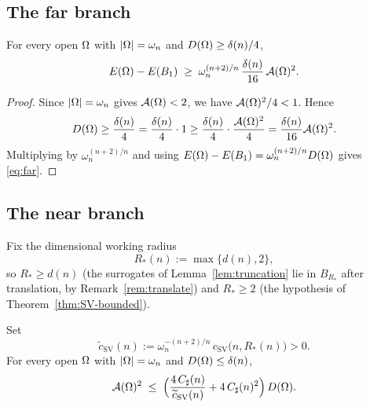 \subsection{The far branch}\label{ssec:far}

\begin{lemma}\label{lem:far}
For every open $\Omega$ with $\left|\Omega\right|=\omega_n$ and
$D(\Omega)\ge\delta(n)/4$,
\begin{equation}\label{eq:far}
   E(\Omega)-E(B_1)\;\ge\;\omega_n^{(n+2)/n}\,\frac{\delta(n)}{16}\,\mathcal{A}(\Omega)^2 .
\end{equation}
\end{lemma}

\begin{proof}
Since $\left|\Omega\right|=\omega_n$ gives $\mathcal{A}(\Omega)<2$, we have
$\mathcal{A}(\Omega)^2/4<1$. Hence
\[
   D(\Omega)\ge\frac{\delta(n)}{4}
   =\frac{\delta(n)}{4}\cdot1
   \ge\frac{\delta(n)}{4}\cdot\frac{\mathcal{A}(\Omega)^2}{4}
   =\frac{\delta(n)}{16}\mathcal{A}(\Omega)^2 .
\]
Multiplying by $\omega_n^{(n+2)/n}$ and using
$E(\Omega)-E(B_1)=\omega_n^{(n+2)/n}D(\Omega)$ gives \eqref{eq:far}.
\end{proof}

\subsection{The near branch}\label{ssec:near}

Fix the dimensional working radius
\begin{equation}\label{eq:Rstar}
   R_*(n):=\max\{d(n),2\},
\end{equation}
so $R_*\ge d(n)$ (the surrogates of Lemma~\ref{lem:truncation} lie in
$B_{R_*}$ after translation, by Remark~\ref{rem:translate}) and
$R_*\ge2$ (the hypothesis of Theorem~\ref{thm:SV-bounded}).

\begin{lemma}\label{lem:near}
Set
\begin{equation}\label{eq:csv-tilde}
   \widetilde c_{\mathrm{SV}}(n)
   :=\omega_n^{-(n+2)/n}\,c_{\mathrm{SV}}\bigl(n,R_*(n)\bigr)>0 .
\end{equation}
For every open $\Omega$ with $\left|\Omega\right|=\omega_n$ and
$D(\Omega)\le\delta(n)$,
\begin{equation}\label{eq:near-Fr}
   \mathcal{A}(\Omega)^2\;\le\;
   \Bigl(\frac{4\,C_\sharp(n)}{\widetilde c_{\mathrm{SV}}(n)}
        +4\,C_\sharp(n)^2\Bigr)\,D(\Omega).
\end{equation}
\end{lemma}

